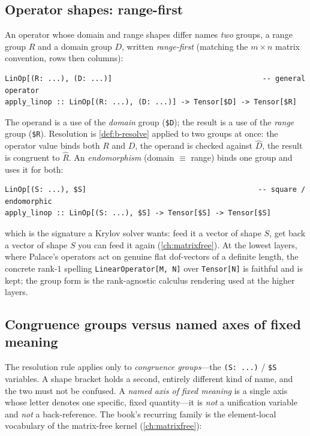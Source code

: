 \subsection{Operator shapes: range-first}
\label{sec:b-operators}

An operator whose domain and range shapes differ names \emph{two} groups, a range
group $R$ and a domain group $D$, written \emph{range-first} (matching the
$m \times n$ matrix convention, rows then columns):

\begin{lstlisting}[style=l4style]
LinOp[(R: ...), (D: ...)]                                   -- general operator
apply_linop :: LinOp[(R: ...), (D: ...)] -> Tensor[$D] -> Tensor[$R]
\end{lstlisting}

\noindent The operand is a use of the \emph{domain} group
(\lstinline[style=l4style]|$D|); the result is a use of the \emph{range} group
(\lstinline[style=l4style]|$R|). Resolution is \cref{def:b-resolve} applied to two
groups at once: the operator value binds both $R$ and $D$, the operand is checked
against $\hat{D}$, the result is congruent to $\hat{R}$. An \emph{endomorphism}
(domain $\equiv$ range) binds one group and uses it for both:

\begin{lstlisting}[style=l4style]
LinOp[(S: ...), $S]                                        -- square / endomorphic
apply_linop :: LinOp[(S: ...), $S] -> Tensor[$S] -> Tensor[$S]
\end{lstlisting}

\noindent which is the signature a Krylov solver wants: feed it a vector of shape
$S$, get back a vector of shape $S$ you can feed it again
(\cref{ch:matrixfree}). At the lowest layers, where Palace's operators act on
genuine flat dof-vectors of a definite length, the concrete rank-$1$ spelling
\lstinline[style=l4style]|LinearOperator[M, N]| over
\lstinline[style=l4style]|Tensor[N]| is faithful and is kept; the group form is the
rank-agnostic calculus rendering used at the higher layers.

\subsection{Congruence groups versus named axes of fixed meaning}
\label{sec:b-fixedaxes}

The resolution rule applies only to \emph{congruence groups}---the
\lstinline[style=l4style]|(S: ...)| / \lstinline[style=l4style]|$S| variables. A
shape bracket holds a second, entirely different kind of name, and the two must not
be confused. A \emph{named axis of fixed meaning} is a single axis whose letter
denotes one specific, fixed quantity---it is \emph{not} a unification variable and
\emph{not} a back-reference. The book's recurring family is the element-local
vocabulary of the matrix-free kernel (\cref{ch:matrixfree}):

